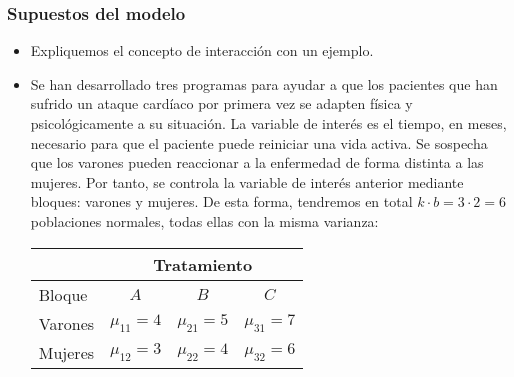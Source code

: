 \begin{frame}
\frametitle{Supuestos del modelo}
\begin{itemize}
\item<2-> Expliquemos el concepto de interacción con un ejemplo.
\item<3-> {\small Se han desarrollado tres programas para ayudar a que los pacientes que han sufrido un ataque cardíaco por primera vez se adapten física y psicológicamente a su situación. La variable de interés es el tiempo, en meses, necesario para que el paciente puede reiniciar una vida activa. Se sospecha que los varones pueden reaccionar a la enfermedad de forma distinta a las mujeres. Por tanto, se controla la variable de interés  anterior mediante bloques: varones y mujeres. De esta forma, tendremos en total $k\cdot b =3\cdot 2=6$ poblaciones normales, todas ellas con la misma varianza:
\begin{center}
\begin{tabular}{lccc}
\hline
&\multicolumn{3}{c}{Tratamiento}\\\hline
Bloque&$A$&$B$&$C$\\\hline
Varones&$\mu_{11}=4$&$\mu_{21}=5$&$\mu_{31}=7$\\
Mujeres&$\mu_{12}=3$&$\mu_{22}=4$&$\mu_{32}=6$\\\hline
\end{tabular}
\end{center}}
\end{itemize}
\end{frame}


